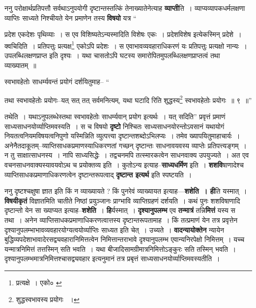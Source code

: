 \documentclass[article,12pt,a4paper]{memoir}
\begin{document}
	  \pstart ननु परोक्षार्थप्रतिपत्तौ सर्वथाऽनुपयोगी दृष्टान्तस्तत्किं तेनाख्यातेनेत्याह \textbf{व्याप्ती}ति । व्याप्यव्यापकधर्मलक्षणा \leavevmode{} व्याप्तिः साध्यते निश्चीयते येन प्रमाणेन तस्य \textbf{विषयो} यत्र  \leavevmode{} “
	  
	प्रदेश एकदेशः पृथिव्याः । स एव विशिष्यतेऽन्यस्मादिति विशेषः एकः । प्रदेशविशेष इत्येकस्मिन् प्रदेशे । क्वचिदिति । प्रतिपत्तुः प्रत्यक्ष\footnote{प्रत्यक्षे । एको० \cite{dp-msC} \cite{dp-msD} \cite{dp-edE} \cite{dp-edN}} एकोऽपि प्रदेशः । स एवाभावव्यवहाराधिकरणं यः प्रतिपत्तुः प्रत्यक्षो नान्यः । उपलब्धिलक्षणप्राप्त इति दृश्यः । यथा चासतोऽपि घटस्य समारोपितमुपलब्धिलक्षणप्राप्तत्वं तथा व्याख्यातम् ॥ 
	  
	स्वभावहेतोः साधर्म्यवन्तं प्रयोगं दर्शयितुमाह-- “
	  
	तथा स्वभावहेतोः प्रयोगः--यत् सत् तत् सर्वमनित्यम्, यथा घटादि रिति शुद्धस्य\footnote{शुद्धस्वभावस्य प्रयोगः \cite{dp-msC} ।} स्वभावहेतोः प्रयोगः ॥ ९ ॥” 
	  
	तथेति । यथाऽनुपलब्धेस्तथा स्वभावहेतोः साधर्म्यवान् प्रयोग इत्यर्थः । यत् सदिति” प्रवृत्तं प्रमाणं साध्यसाधनयोर्व्याप्तिमवस्यति । स च विषयो \textbf{दृष्टो} निश्चितः साध्यसाधनयोरन्तोऽवसानं यथायोगं नियतत्वनियमविषयत्वनिपुणो यस्मिन्निति व्युत्पत्त्या दृष्टान्तशब्दोऽभिलप्यः । तमेव ख्यापयितुमाहाचार्यः । अनेनैतदाकूतम्--व्याप्तिसाधकप्रमाणस्याधिकरणतां गच्छन् दृष्टान्तः साधनावयवस्य व्याप्तेः प्रतिपत्त्यङ्गम् । न तु साक्षात्साधनस्य । नापि साध्यसिद्धेः । तद्वचनमपि तत्स्मारकत्वेन साधनवाक्य उपयुज्यते । अत एव वचनसाधनवाक्यस्यावयवोऽथ च प्रयोक्तव्य इति । कुतोऽन्य इत्याह--\textbf{साध्यधर्मिण} इति । \textbf{शशवि}षाणादेश्च व्याप्तिसाधकप्रमाणाधिकरणत्वेन दृष्टान्तरूपत्वाद् \textbf{दृष्टान्त इत्यर्थ} इति स्पष्टयति ।
	\pend
      

	  \pstart ननु दृष्टश्चक्षुषा ज्ञात इति किं न व्याख्यायते ? किं पुनरेवं व्याख्यायत इत्याह—\textbf{शशेति । ही}ति यस्मात् । \textbf{विषयीकृतं} विज्ञातमिति चातीते निष्ठां प्रयुञ्जानः प्राग्भावि व्याप्तिग्रहणं दर्शयति । कथं पुनः शशविषाणादि दृष्टान्तो येन सा ख्याप्यत इत्याह--\textbf{शशेति} । \textbf{हि}र्यस्मात् । \textbf{दृश्यानुपलम्भ} एव \textbf{तन्मात्रं} तन्नि\textbf{मित्तं} यस्य स तथा । अनेन व्याप्तिसाधकप्रमाणाधिकरणत्वात्तस्य दृष्टान्तरूपतामाह । किं तत्प्रमाणं येन तत्र प्रवृत्तेन दृश्यानुपलम्भाभावव्यवहारयोग्यत्वयोर्व्याप्तिः साध्यत इति चेत् । उच्यते । \textbf{वादन्यायोक्तेन} न्यायेन बुद्धिव्यपदेशाभावादेरसद्व्यवहारानिमित्तत्वेन निमित्तान्तराभावे दृश्यानुपलम्भ एवान्यनिरपेक्षो निमित्तम् । यच्च यन्मात्रनिमित्तं तत्तस्मिन् सति भवति । यथा बीजादिसामग्रीमात्रनिमित्तोऽङ्कुरः सति तस्मिन् भवति । दृश्यानुपलम्भमात्रनिमित्तश्चासद्व्यवहार इत्यनुमानं तत्र प्रबृत्तं साध्यसाधनयोर्व्याप्तिमवस्यतीति ।
	\pend
      
\end{document}
